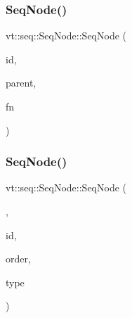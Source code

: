 \mbox{\label{structvt_1_1seq_1_1_seq_node_abeae2f846c0f061bdb30b0f36b1ed6af}} 
\subsubsection{\texorpdfstring{Seq\+Node()}{SeqNode()}\hspace{0.1cm}{\footnotesize\ttfamily [5/6]}}
{\footnotesize\ttfamily vt\+::seq\+::\+Seq\+Node\+::\+Seq\+Node (\begin{DoxyParamCaption}\item[{\hyperlink{namespacevt_1_1seq_a3b612da217ac669d39c159f134ab8434}{Seq\+Type} const \&}]{id,  }\item[{\hyperlink{namespacevt_1_1seq_ae6a4874b585be0612aaca32ca6d2d191}{Seq\+Node\+Ptr\+Type}}]{parent,  }\item[{\hyperlink{namespacevt_1_1seq_ab345c700c06d135cafba39f711767ad5}{Seq\+Expand\+Fun\+Type} const \&}]{fn }\end{DoxyParamCaption})}

\mbox{\label{structvt_1_1seq_1_1_seq_node_a5e385a8ece70d313f3c20ba6505fff2b}} 
\subsubsection{\texorpdfstring{Seq\+Node()}{SeqNode()}\hspace{0.1cm}{\footnotesize\ttfamily [6/6]}}
{\footnotesize\ttfamily vt\+::seq\+::\+Seq\+Node\+::\+Seq\+Node (\begin{DoxyParamCaption}\item[{Seq\+Node\+Universal\+Tag}]{,  }\item[{\hyperlink{namespacevt_1_1seq_a3b612da217ac669d39c159f134ab8434}{Seq\+Type} const \&}]{id,  }\item[{\hyperlink{namespacevt_1_1seq_a313357c71bba2bea5c57f50d69f1edf7}{Order\+Enum} const \&}]{order,  }\item[{\hyperlink{namespacevt_1_1seq_ae721d4e8b95cf57a7e4169db1929e0f1}{Type\+Enum} const \&}]{type }\end{DoxyParamCaption})}

